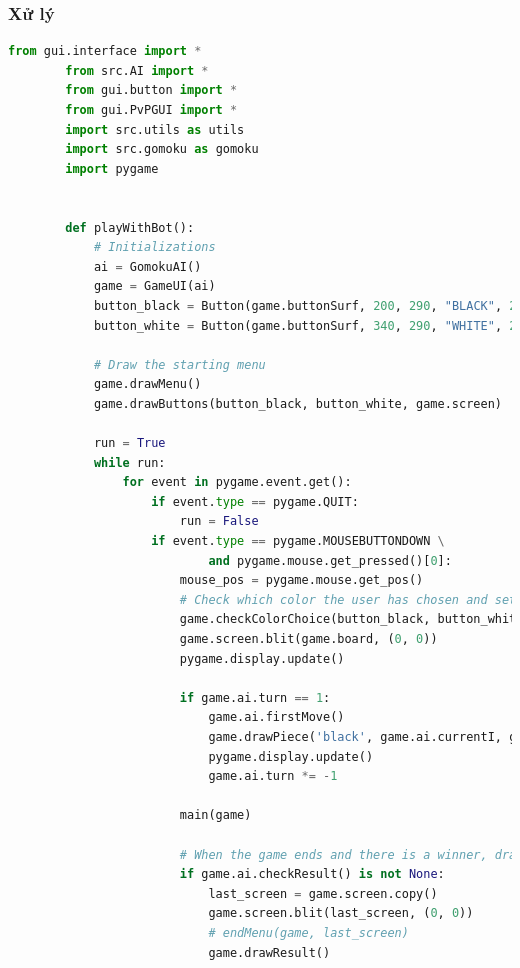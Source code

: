 \documentclass[a4paper]{article}
\begin{document}
    \subsubsection{Xử lý}
    \begin{lstlisting}[language=Python]
        from gui.interface import *
        from src.AI import *
        from gui.button import *
        from gui.PvPGUI import *
        import src.utils as utils
        import src.gomoku as gomoku
        import pygame

        
        def playWithBot():
            # Initializations
            ai = GomokuAI()
            game = GameUI(ai)
            button_black = Button(game.buttonSurf, 200, 290, "BLACK", 22)
            button_white = Button(game.buttonSurf, 340, 290, "WHITE", 22)
        
            # Draw the starting menu
            game.drawMenu()
            game.drawButtons(button_black, button_white, game.screen)
        
            run = True
            while run:
                for event in pygame.event.get():
                    if event.type == pygame.QUIT:
                        run = False
                    if event.type == pygame.MOUSEBUTTONDOWN \
                            and pygame.mouse.get_pressed()[0]:
                        mouse_pos = pygame.mouse.get_pos()
                        # Check which color the user has chosen and set the states
                        game.checkColorChoice(button_black, button_white, mouse_pos)
                        game.screen.blit(game.board, (0, 0))
                        pygame.display.update()
        
                        if game.ai.turn == 1:
                            game.ai.firstMove()
                            game.drawPiece('black', game.ai.currentI, game.ai.currentJ)
                            pygame.display.update()
                            game.ai.turn *= -1
        
                        main(game)
        
                        # When the game ends and there is a winner, draw the result board
                        if game.ai.checkResult() is not None:
                            last_screen = game.screen.copy()
                            game.screen.blit(last_screen, (0, 0))
                            # endMenu(game, last_screen)
                            game.drawResult()
        

\end{lstlisting}
\end{document}
